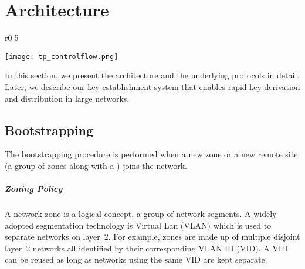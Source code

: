 \chapter{Architecture}

\begin{wrapfigure}{r}{0.5\textwidth}
    \begin{center}
        \texttt{[image: tp\_controlflow.png]}
        \label{archi:overview}
    \end{center}
\end{wrapfigure}

In this section, we present the \name architecture and the underlying protocols in detail. 
Later, we describe our key-establishment system that enables rapid key derivation 
and distribution in large networks. 

\section{\name Bootstrapping}
\label{sec:bootstrapping}

The bootstrapping procedure is performed when a new zone or a new remote site 
(a group of zones along with a \tp) joins the network. 

\paragraph{Zoning Policy} %
A network zone is a logical concept, a group of network segments. A widely adopted 
segmentation technology is Virtual Lan (VLAN) which is used to separate networks on
layer~2. For example, zones are made up of multiple disjoint layer~2 networks
all identified by their corresponding VLAN ID (VID). A VID can be reused as long
as networks using the same VID are kept separate.

